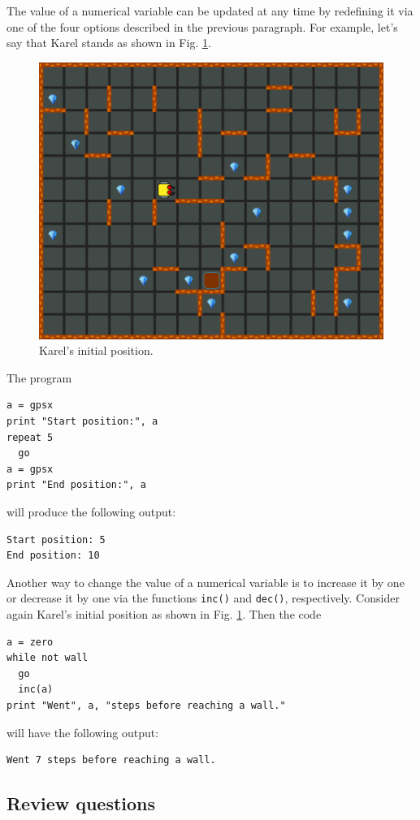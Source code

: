 \documentclass[article,A4,12pt]{llncs}
\begin{document}
{{{{The value of a numerical variable can be updated at any time by redefining it via 
one of the four options described in the previous paragraph. For example, let's say that 
Karel stands as shown in Fig. \ref{fig:var1}.
\newpage
\begin{figure}[!ht]
\begin{center}
\includegraphics[height=0.4\textwidth]{img/variables1.png}
\end{center}
\vspace{-4mm}
\caption{Karel's initial position.}
\label{fig:var1}
\end{figure}
\noindent
The program

\begin{verbatim}
a = gpsx
print "Start position:", a
repeat 5
  go
a = gpsx 
print "End position:", a
\end{verbatim}
will produce the following output:

\begin{verbatim}
Start position: 5
End position: 10
\end{verbatim}
Another way to change the value of a numerical variable is to increase it by one or 
decrease it by one via the functions {\tt inc()} and 
{\tt dec()}, respectively. Consider again Karel's initial position as shown 
in Fig. \ref{fig:var1}. Then the code

\begin{verbatim}
a = zero
while not wall
  go
  inc(a)
print "Went", a, "steps before reaching a wall."
\end{verbatim}
will have the following output:

\begin{verbatim}
Went 7 steps before reaching a wall.
\end{verbatim}

\subsection{Review questions}

}}}}
\end{document}

